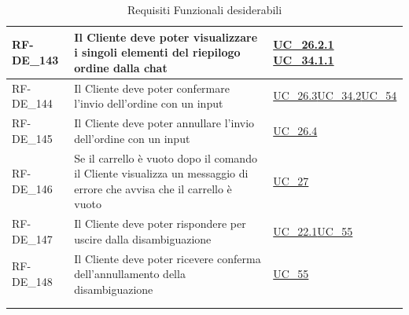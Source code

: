 \begin{longtable}{|>{\raggedright}p{}|>{\raggedright\arraybackslash}p{}|>{\raggedright\arraybackslash}p{}|}
	\hline
	RF-DE\_143 \hypertarget{rf-de_143} & Il Cliente deve poter visualizzare i singoli elementi del riepilogo ordine dalla chat & \hyperref[uc_26.2.1]{UC\_26.2.1} \newline \hyperref[uc_34.1.1]{UC\_34.1.1} \\
	\hline
	RF-DE\_144 \hypertarget{rf-de_144} & Il Cliente deve poter confermare l'invio dell'ordine con un input & \hyperref[uc_26.3]{UC\_26.3}\newline \hyperref[uc_34.2]{UC\_34.2}\newline \hyperref[uc_54]{UC\_54} \\
	\hline
	RF-DE\_145 \hypertarget{rf-de_145} & Il Cliente deve poter annullare l'invio dell'ordine con un input & \hyperref[uc_26.4]{UC\_26.4}\\
	\hline
	RF-DE\_146 \hypertarget{rf-de_146} & Se il carrello è vuoto dopo il comando \vr{/invia} il Cliente visualizza un messaggio di errore che avvisa che il carrello è vuoto & \hyperref[uc_27]{UC\_27} \\
	\hline
	RF-DE\_147 \hypertarget{rf-de_147} & Il Cliente deve poter rispondere \vr{/annulla} per uscire dalla disambiguazione & \hyperref[uc_22.1]{UC\_22.1}\newline \hyperref[uc_55]{UC\_55} \\
	\hline
	RF-DE\_148 \hypertarget{rf-de_148} & Il Cliente deve poter ricevere conferma dell'annullamento della disambiguazione & \hyperref[uc_55]{UC\_55} \\
	\hline
	\multicolumn{3}{c}{} \\
	\caption{Requisiti Funzionali desiderabili}\hypertarget{tab:funzionali_desiderabili}\\
\end{longtable}

	

